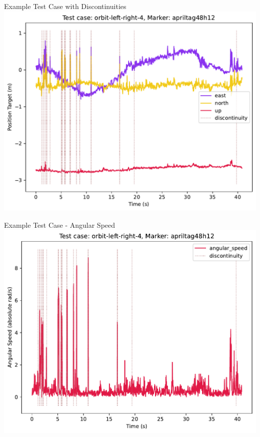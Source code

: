 \documentclass[aspectratio=169]{beamer}
\begin{document}
\begin{frame}{Example Test Case with Discontinuities}
	\centering
	\includegraphics[width=0.75\linewidth]{images/orbit-left-right-4_apriltag48h12_position-target}
\end{frame}

\begin{frame}{Example Test Case - Angular Speed}
	\centering
	\includegraphics[width=0.7\linewidth]{images/orbit-left-right-4_apriltag48h12_angular-velocity}
\end{frame}
\end{document}
